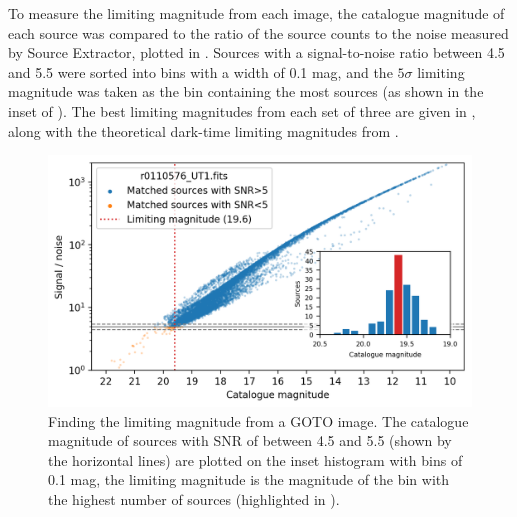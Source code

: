 \begin{colsection}
\begin{colsection}
To measure the limiting magnitude from each image, the catalogue magnitude of each source was compared to the ratio of the source counts to the noise measured by Source Extractor, plotted in . Sources with a signal-to-noise ratio between 4.5 and 5.5 were sorted into bins with a width of 0.1 mag, and the $5\sigma$ limiting magnitude was taken as the bin containing the most sources (as shown in the inset of ). The best limiting magnitudes from each set of three are given in , along with the theoretical dark-time limiting magnitudes from .

\begin{figure}[t]
    \begin{center}
        \includegraphics[width=\textwidth]{images/throughput/limiting_mag_real.png}
    \end{center}
    \caption[Finding the limiting magnitude from a GOTO image]{
        Finding the limiting magnitude from a GOTO image. The catalogue magnitude of sources with SNR of between 4.5 and 5.5 (shown by the  horizontal lines) are plotted on the inset histogram with bins of 0.1 mag, the limiting magnitude is the magnitude of the bin with the highest number of sources (highlighted in ).
    }\label{fig:lim_mag}
\end{figure}

\newpage


\end{colsection}
\end{colsection}
